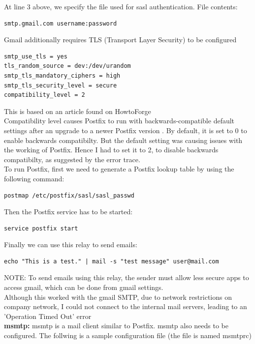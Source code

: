 \documentclass[a4paper,12pt]{article}
\begin{document}
At line 3 above, we specify the file used for sasl authentication. File contents:
\begin{lstlisting}[style=ShellStyle]
smtp.gmail.com username:password
\end{lstlisting}

Gmail additionally requires TLS (Transport Layer Security) to be configured
\begin{lstlisting}[style=ShellStyle]
smtp_use_tls = yes
tls_random_source = dev:/dev/urandom
smtp_tls_mandatory_ciphers = high
smtp_tls_security_level = secure
compatibility_level = 2
\end{lstlisting}
This is based on an article found on HowtoForge \cite{postfix}\\

Compatibility level causes Postfix to run with backwards-compatible default settings after an upgrade to a newer Postfix version \cite{compatibility}. By default, it is set to 0 to enable backwards compatibilty. But the default setting was causing issues with the working of Postfix. Hence I had to set it to 2, to disable backwards compatibilty, as suggested by the error trace.\\

To run Postfix, first we need to generate a Postfix lookup table by using the following command:
\begin{lstlisting}[style=ShellStyle]
postmap /etc/postfix/sasl/sasl_passwd
\end{lstlisting} 
Then the Postfix service has to be started:
\begin{lstlisting}[style=ShellStyle]
service postfix start
\end{lstlisting}
Finally we can use this relay to send emails:
\begin{lstlisting}[style=ShellStyle]
echo "This is a test." | mail -s "test message" user@mail.com
\end{lstlisting}
NOTE: To send emails using this relay, the sender must allow less secure apps to access gmail, which can be done from gmail settings.\\

Although this worked with the gmail SMTP, due to network restrictions on company network, I could not connect to the internal mail servers, leading to an 'Operation Timed Out' error\\

\textbf{msmtp:} msmtp is a mail client similar to Postfix. msmtp also needs to be configured. The follwing is a sample configuration file (the file is named msmtprc) \cite{msmtp}
\end{document}
